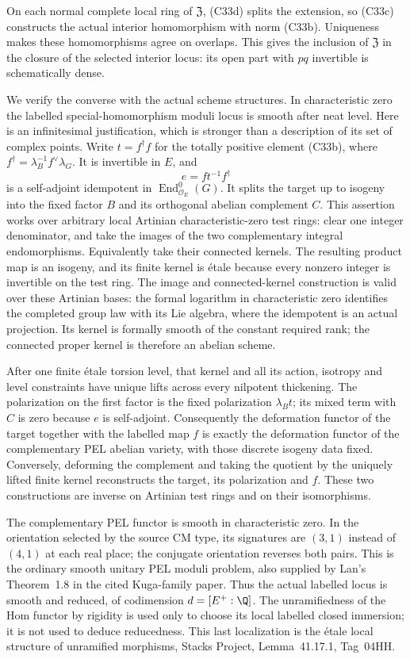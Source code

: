 On each normal complete local ring of
$\mathfrak Z$, (C33d) splits the extension,
so (C33c) constructs the actual interior
homomorphism with norm (C33b). Uniqueness
makes these homomorphisms agree on overlaps.
This gives the inclusion of $\mathfrak Z$
in the closure of the selected interior
locus: its open part with $pq$ invertible
is schematically dense.

We verify the converse with the actual
scheme structures. In characteristic zero
the labelled special-homomorphism moduli
locus is smooth after neat level. Here is
an infinitesimal justification, which is
stronger than a description of its set
of complex points. Write $t=f^\dagger f$
for the totally positive element (C33b),
where $f^\dagger=\lambda_B^{-1}f^\vee\lambda_G$.
It is invertible in $E$, and
\[
                  e=f t^{-1}f^\dagger
\]
is a self-adjoint idempotent in
$\operatorname{End}^0_{\mathcal O_E}(G)$.
It splits the target up to isogeny into
the fixed factor $B$ and its orthogonal
abelian complement $C$. This assertion
works over arbitrary local Artinian
characteristic-zero test rings: clear
one integer denominator, and take the
images of the two complementary integral
endomorphisms. Equivalently take their
connected kernels. The resulting product
map is an isogeny, and its finite kernel
is \'etale because every nonzero integer
is invertible on the test ring.
The image and connected-kernel construction
is valid over these Artinian bases: the
formal logarithm in characteristic zero
identifies the completed group law with
its Lie algebra, where the idempotent is
an actual projection. Its kernel is
formally smooth of the constant required
rank; the connected proper kernel is
therefore an abelian scheme.

After one finite \'etale torsion level,
that kernel and all its action, isotropy
and level constraints have unique lifts
across every nilpotent thickening. The
polarization on the first factor is the
fixed polarization $\lambda_B t$; its
mixed term with $C$ is zero because
$e$ is self-adjoint. Consequently the
deformation functor of the target
together with the labelled map $f$
is exactly the deformation functor of
the complementary PEL abelian variety,
with those discrete isogeny data fixed.
Conversely, deforming the complement
and taking the quotient by the uniquely
lifted finite kernel reconstructs the
target, its polarization and $f$.
These two constructions are inverse
on Artinian test rings and on their
isomorphisms.

The complementary PEL functor is smooth
in characteristic zero. In the orientation
selected by the source CM type, its
signatures are $(3,1)$ instead of
$(4,1)$ at each real place; the conjugate
orientation reverses both pairs. This
is the ordinary smooth unitary PEL
moduli problem, also supplied by Lan's
Theorem~1.8 in the cited Kuga-family
paper. Thus the actual labelled locus
is smooth and reduced, of codimension
$d=[E^+:\Q]$. The unramifiedness of the
Hom functor by rigidity is used only
to choose its local labelled closed
immersion; it is not used to deduce
reducedness. This last localization is
the \'etale local structure of unramified
morphisms, Stacks Project, Lemma~41.17.1,
Tag~04HH.

